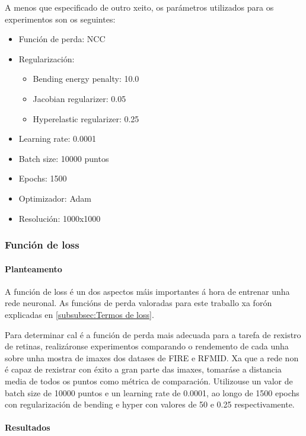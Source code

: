 A menos que especificado de outro xeito, os parámetros utilizados para os experimentos son os seguintes:
\begin{itemize}
    \item Función de perda: NCC
    \item Regularización:
    \begin{itemize}
         \item Bending energy penalty: 10.0
         \item Jacobian regularizer: 0.05
         \item Hyperelastic regularizer: 0.25
    \end{itemize}
    \item Learning rate: 0.0001
    \item Batch size: 10000 puntos
    \item Epochs: 1500
    \item Optimizador: Adam
    \item Resolución: 1000x1000
\end{itemize}


\subsubsection{Función de loss}
\label{subsubsec:Función de loss}

\paragraph{Planteamento}
\label{par:Planteamento}

A función de loss é un dos aspectos máis importantes á hora de entrenar unha rede neuronal.
As funcións de perda valoradas para este traballo xa forón explicadas en \ref{subsubsec:Termos de loss}.

Para determinar cal é a función de perda mais adecuada para a tarefa de rexistro de retinas, realizáronse experimentos comparando o rendemento de cada unha sobre unha mostra de imaxes dos datases de FIRE e RFMID.
Xa que a rede non é capaz de rexistrar con éxito a gran parte das imaxes, tomaráse a distancia media de todos os puntos como métrica de comparación.
Utilizouse un valor de batch size de 10000 puntos e un learning rate de 0.0001, ao longo de 1500 epochs con regularización de bending e hyper con valores de 50 e 0.25 respectivamente.

\paragraph{Resultados}
\label{par:Resultados}

